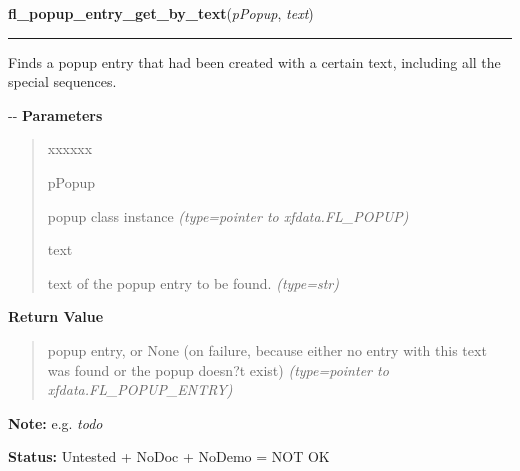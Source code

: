    \label{xformslib:flpopup:fl_popup_entry_get_by_text}

    \vspace{0.5ex}

\hspace{.8\funcindent}\begin{boxedminipage}{\funcwidth}

    \raggedright \textbf{fl\_popup\_entry\_get\_by\_text}(\textit{pPopup}, \textit{text})

    \vspace{-1.5ex}

    \rule{\textwidth}{0.5\fboxrule}
\setlength{\parskip}{2ex}

Finds a popup entry that had been created with a certain text,
including all the special sequences.

-{}-
\setlength{\parskip}{1ex}
      \textbf{Parameters}
      \vspace{-1ex}

      \begin{quote}
        \begin{Ventry}{xxxxxx}

          \item[pPopup]


popup class instance
            {\it (type=pointer to xfdata.FL\_POPUP)}

          \item[text]


text of the popup entry to be found.
            {\it (type=str)}

        \end{Ventry}

      \end{quote}

      \textbf{Return Value}
    \vspace{-1ex}

      \begin{quote}

popup entry, or None (on failure, because either no entry
with this text was found or the popup doesn?t exist)
      {\it (type=pointer to xfdata.FL\_POPUP\_ENTRY)}

      \end{quote}

\textbf{Note:} 
e.g. \emph{todo}


\textbf{Status:} 
Untested + NoDoc + NoDemo = NOT OK


    \end{boxedminipage}

